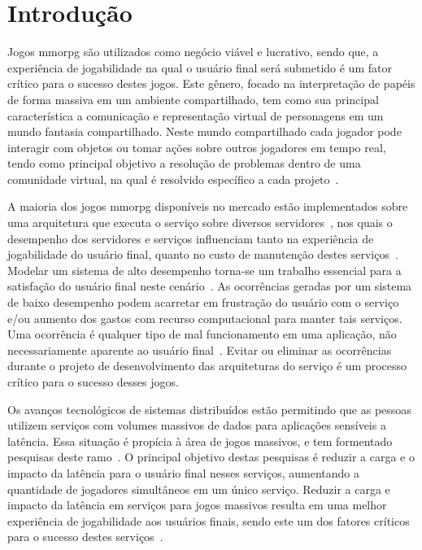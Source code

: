 \chapter{Introdução}
\label{introducao}


Jogos \acf{mmorpg} são utilizados como negócio viável e lucrativo, sendo que, a experiência de jogabilidade na qual o usuário final será submetido é um fator crítico para o sucesso destes jogos.
%
Este gênero, focado na interpretação de papéis de forma massiva em um ambiente compartilhado, tem como sua principal característica a comunicação e representação virtual de personagens em um mundo fantasia compartilhado.
%
Neste mundo compartilhado cada jogador pode interagir com objetos ou tomar ações sobre outros jogadores em tempo real, tendo como principal objetivo a resolução de problemas dentro de uma comunidade virtual, na qual é resolvido específico a cada projeto~\cite{video_game_technologies}.



A maioria dos jogos \ac{mmorpg} disponíveis no mercado estão implementados sobre uma arquitetura que executa o serviço sobre diversos servidores~\cite{stephenclarkewillson2017}, nos quais o desempenho dos servidores e serviços influenciam tanto na experiência de jogabilidade do usuário final, quanto no custo de manutenção destes serviços~\cite{1417630}.
%
Modelar um sistema de alto desempenho torna-se um trabalho essencial para a satisfação do usuário final neste cenário~\cite{1417630}.
%
As ocorrências geradas por um sistema de baixo desempenho podem acarretar em frustração do usuário com o serviço e/ou aumento dos gastos com recurso computacional para manter tais serviços.
%
Uma ocorrência é qualquer tipo de mal funcionamento em uma aplicação, não necessariamente aparente ao usuário final~\cite{1417630}.
%
Evitar ou eliminar as ocorrências durante o projeto de desenvolvimento das arquiteturas do serviço é um processo crítico para o sucesso desses jogos.


Os avanços tecnológicos de sistemas distribuídos estão permitindo que as pessoas utilizem serviços com volumes massivos de dados para aplicações sensíveis a latência.
%
Essa situação é propícia à área de jogos massivos, e tem formentado pesquisas deste ramo~\cite{mmo_analytic,1417630,6267019,6063041}.
%
O principal objetivo destas pesquisas é reduzir a carga e o impacto da latência para o usuário final nesses serviços, aumentando a quantidade de jogadores simultâneos em um único serviço.
%
Reduzir a carga e impacto da latência em serviços para jogos massivos resulta em uma melhor experiência de jogabilidade aos usuários finais, sendo este um dos fatores críticos para o sucesso destes serviços~\cite{1417630}.



